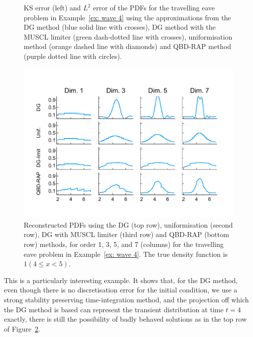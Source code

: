 \begin{example}
\begin{figure}[h]
	\caption{KS error (left) and \(L^2\) error of the PDFs for the travelling eave problem in Example~\ref{ex: wave 4} using the approximations from the DG method (blue solid line with crosses), DG method with the MUSCL limiter (green dash-dotted line with crosses), uniformisation method (orange dashed line with diamonds) and QBD-RAP method (purple dotted line with circles).} 
	\label{fig: fun 4 wave} 
\end{figure}
\begin{figure}[h]
	\centering
	\includegraphics[width=\textwidth,trim={0cm 1.25cm 0cm 1.25cm},clip]{chapter6/figs/wave/fun4/pdfs_formatted.pdf}
	\caption{Reconstructed PDFs using the DG (top row), uniformisation (second row), DG with MUSCL limiter (third row) and QBD-RAP (bottom row) methods, for order 1, 3, 5, and 7 (columns) for the travelling eave problem in Example~\ref{ex: wave 4}. The true density function is \(1(4\leq x<5)\).}
	\label{fig: pdf wave fun 4}
\end{figure} 

This is a particularly interesting example. It shows that, for the DG method, even though there is no discretisation error for the initial condition, we use a strong stability preserving time-integration method, and the projection off which the DG method is based can represent the transient distribution at time \(t=4\) exactly, there is still the possibility of badly behaved solutions as in the top row of Figure~\ref{fig: pdf wave fun 4}. 
\exampleFloatBarrier
\end{example}

